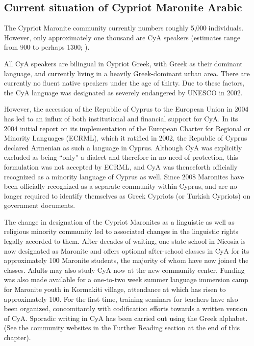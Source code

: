 \documentclass[output=paper]{langsci/langscibook}
\begin{document}
\subsection{Current situation of Cypriot Maronite Arabic}
The Cypriot Maronite community currently numbers roughly 5,000 individuals. However, only approximately one thousand are CyA speakers (estimates range from 900 to perhaps 1300; \citealt{CouncilofEurope2017}).

All CyA speakers are bilingual in Cypriot Greek, with Greek as their dominant language, and currently living in a heavily Greek-dominant urban area. There are currently no fluent native speakers under the age of thirty. Due to these factors, the CyA language was designated as severely endangered by UNESCO in 2002. 

However, the accession of the Republic of Cyprus to the European Union in 2004 has led to an influx of both institutional and financial support for CyA. In its 2004 initial report on its implementation of the European Charter for Regional or Minority Languages (ECRML), which it ratified in 2002, the Republic of Cyprus declared Armenian as such a language in Cyprus. Although CyA was explicitly excluded as being “only” a dialect and therefore in no need of protection, this formulation was not accepted by ECRML, and CyA was thenceforth officially recognized as a minority language of Cyprus as well. Since 2008 Maronites have been officially recognized as a separate community within Cyprus, and are no longer required to identify themselves as Greek Cypriots (or Turkish Cypriots) on government documents.

The change in designation of the Cypriot Maronites as a linguistic as well as religious minority community led to associated changes in the linguistic rights legally accorded to them. After decades of waiting, one state school in Nicosia is now designated as Maronite and offers optional after-school classes in CyA for its approximately 100 Maronite students, the majority of whom have now joined the classes. Adults may also study CyA now at the new community center. Funding was also made available for a one-to-two week summer language immersion camp for Maronite youth in Kormakiti village, attendance at which has risen to approximately 100. For the first time, training seminars for teachers have also been organized, concomitantly with codification efforts towards a written version of CyA. Sporadic writing in CyA has been carried out using the Greek alphabet. (See the community websites in the Further Reading section at the end of this chapter). 
\end{document}

